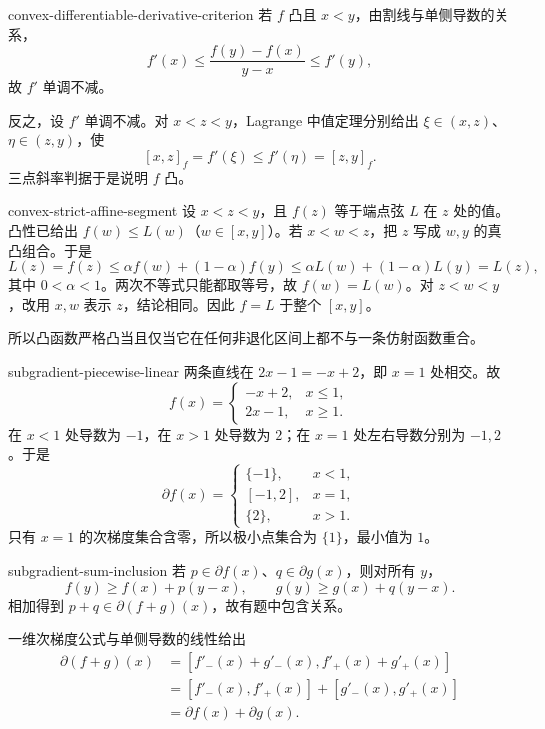 \begin{solution}{convex-differentiable-derivative-criterion}
若 \(f\) 凸且 \(x<y\)，由割线与单侧导数的关系，
\[
 f'(x)\le\frac{f(y)-f(x)}{y-x}\le f'(y),
\]
故 \(f'\) 单调不减。

反之，设 \(f'\) 单调不减。对 \(x<z<y\)，Lagrange 中值定理分别给出 \(\xi\in(x,z)\)、\(\eta\in(z,y)\)，使
\[
 [x,z]_f=f'(\xi)\le f'(\eta)=[z,y]_f.
\]
三点斜率判据于是说明 \(f\) 凸。
\end{solution}

\begin{solution}{convex-strict-affine-segment}
设 \(x<z<y\)，且 \(f(z)\) 等于端点弦 \(L\) 在 \(z\) 处的值。凸性已给出 \(f(w)\le L(w)\)（\(w\in[x,y]\)）。若 \(x<w<z\)，把 \(z\) 写成 \(w,y\) 的真凸组合。于是
\[
 L(z)=f(z)\le\alpha f(w)+(1-\alpha)f(y)
 \le\alpha L(w)+(1-\alpha)L(y)=L(z),
\]
其中 \(0<\alpha<1\)。两次不等式只能都取等号，故 \(f(w)=L(w)\)。对 \(z<w<y\)，改用 \(x,w\) 表示 \(z\)，结论相同。因此 \(f=L\) 于整个 \([x,y]\)。

所以凸函数严格凸当且仅当它在任何非退化区间上都不与一条仿射函数重合。
\end{solution}

\begin{solution}{subgradient-piecewise-linear}
两条直线在 \(2x-1=-x+2\)，即 \(x=1\) 处相交。故
\[
 f(x)=\begin{cases}-x+2,&x\le1,\\2x-1,&x\ge1.
 \end{cases}
\]
在 \(x<1\) 处导数为 \(-1\)，在 \(x>1\) 处导数为 \(2\)；在 \(x=1\) 处左右导数分别为 \(-1,2\)。于是
\[
 \partial f(x)=
 \begin{cases}
  \{-1\},&x<1,\\
  [-1,2],&x=1,\\
  \{2\},&x>1.
 \end{cases}
\]
只有 \(x=1\) 的次梯度集合含零，所以极小点集合为 \(\{1\}\)，最小值为 \(1\)。
\end{solution}

\begin{solution}{subgradient-sum-inclusion}
若 \(p\in\partial f(x)\)、\(q\in\partial g(x)\)，则对所有 \(y\)，
\[
 f(y)\ge f(x)+p(y-x),\qquad
 g(y)\ge g(x)+q(y-x).
\]
相加得到 \(p+q\in\partial(f+g)(x)\)，故有题中包含关系。

一维次梯度公式与单侧导数的线性给出
\[
 \begin{aligned}
 \partial(f+g)(x)
 &=[f'_-(x)+g'_-(x),f'_+(x)+g'_+(x)]\\
 &=[f'_-(x),f'_+(x)]+[g'_-(x),g'_+(x)]\\
 &=\partial f(x)+\partial g(x).
 \end{aligned}
\]
\end{solution}

